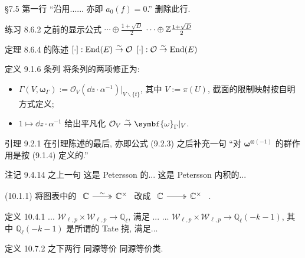 \documentclass{AJerrata}
\newcommand{\bomega}{\symbf{\omega}}	%
\begin{document}
\begin{Errata}
		\item[\S 7.5 第一行 ``沿用...... 亦即 $a_0(f)=0$.'']
		删除此行.
		
		\item[练习 8.6.2 之前的显示公式]
		\Orig $\cdots \oplus \frac{1 + \sqrt{D}}{2}$
		\Corr $\cdots \oplus \mathbb{Z} \frac{1 + \sqrt{D}}{2}$
		
		\item[定理 8.6.4 的陈述]
		\Orig $[\cdot]: \operatorname{End}(E) \stackrel{\sim}{\rightarrow} \mathcal{O}$
		\Corr $[\cdot]: \mathcal{O} \stackrel{\sim}{\rightarrow} \operatorname{End}(E)$
		
		\item[定义 9.1.6 条列]
		将条列的两项修正为:
		\begin{itemize}
			\item $\Gamma(V, \bomega_\Gamma) := \mathcal{O}_V (\dd z \cdot \alpha^{-1}) |_{V \smallsetminus \{t\}}$, 其中 $V := \pi(U)$, 截面的限制映射按自明方式定义;
			\item $1 \mapsto \dd z \cdot \alpha^{-1}$ 给出平凡化 $\mathcal{O}_V \rightiso \bomega_\Gamma |_V$.
		\end{itemize}
		
		\item[引理 9.2.1]
		在引理陈述的最后, 亦即公式 (9.2.3) 之后补充一句 ``对 $\bomega^{\otimes (-1)}$ 的群作用是按 (9.1.4) 定义的.''

		\item[注记 9.4.14 之上一句]
		\Orig 这是 Petersson 的...
		\Corr 这是 Petersson 内积的...
		
		\item[(10.1.1)] 将图表中的
		$\begin{tikzcd} \mathbb{C} \arrow[twoheadrightarrow, r, "\sim"] & \mathbb{C}^\times \end{tikzcd}$
		改成
		$\begin{tikzcd} \mathbb{C} \arrow[twoheadrightarrow, r] & \mathbb{C}^\times \end{tikzcd}$ .

		\item[定义 10.4.1]
		\Orig ... $\mathcal{W}_{\ell, p} \times \mathcal{W}_{\ell, p} \to \mathbb{Q}_\ell$, 满足 ...
		\Corr ... $\mathcal{W}_{\ell, p} \times \mathcal{W}_{\ell, p} \to \mathbb{Q}_\ell(-k-1)$, 其中 $\mathbb{Q}_\ell(-k-1)$ 是所谓的 Tate 挠, 满足...
		
		\item[定义 10.7.2 之下两行]
		\Orig 同源等价
		\Corr 同源等价类.
	\end{Errata}
\end{document}
